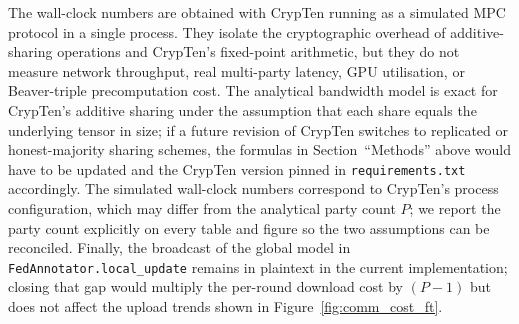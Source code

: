 \documentclass{article}
\begin{document}
The wall-clock numbers are obtained with CrypTen running as a simulated
MPC protocol in a single process. They isolate the cryptographic
overhead of additive-sharing operations and CrypTen's fixed-point
arithmetic, but they do not measure network throughput, real
multi-party latency, GPU utilisation, or Beaver-triple precomputation
cost. The analytical bandwidth model is exact for CrypTen's additive
sharing under the assumption that each share equals the underlying
tensor in size; if a future revision of CrypTen switches to replicated
or honest-majority sharing schemes, the formulas in
Section~``Methods'' above would have to be updated and the CrypTen
version pinned in \texttt{requirements.txt} accordingly. The simulated
wall-clock numbers correspond to CrypTen's process configuration,
which may differ from the analytical party count $P$; we report the
party count explicitly on every table and figure so the two
assumptions can be reconciled. Finally, the broadcast of the global
model in \texttt{FedAnnotator.local\_update} remains in plaintext in
the current implementation; closing that gap would multiply the
per-round download cost by $(P-1)$ but does not affect the upload
trends shown in Figure~\ref{fig:comm_cost_ft}.
\end{document}
